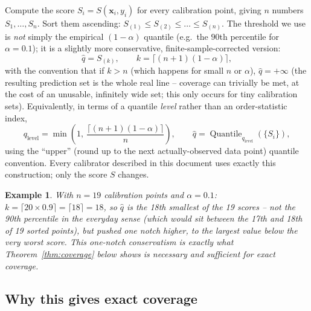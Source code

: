\documentclass[11pt]{article}
\newtheorem{example}{Example}[section]
\begin{document}
Compute the score $S_i = S(\bm x_i, y_i)$ for every calibration point, giving $n$ numbers
$S_1,\dots,S_n$. Sort them ascending: $S_{(1)} \le S_{(2)} \le \dots \le S_{(n)}$. The threshold we
use is \emph{not} simply the empirical $(1-\alpha)$ quantile (e.g.\ the $90$th percentile for
$\alpha=0.1$); it is a slightly more conservative, finite-sample-corrected version:
\begin{equation}
\hat q = S_{(k)}, \qquad k = \Big\lceil (n+1)(1-\alpha) \Big\rceil,
\label{eq:qlevel-order}
\end{equation}
with the convention that if $k>n$ (which happens for small $n$ or $\alpha$), $\hat q = +\infty$
(the resulting prediction set is the whole real line -- coverage can trivially be met, at the cost
of an unusable, infinitely wide set; this only occurs for tiny calibration sets). Equivalently, in
terms of a quantile \emph{level} rather than an order-statistic index,
\begin{equation}
q_{\mathrm{level}} = \min\!\left(1,\ \frac{\lceil (n+1)(1-\alpha)\rceil}{n}\right), \qquad
\hat q = \operatorname{Quantile}_{q_{\mathrm{level}}}(\{S_i\}),
\label{eq:qlevel}
\end{equation}
using the ``upper'' (round up to the next actually-observed data point) quantile convention. Every
calibrator described in this document uses exactly this construction; only the score $S$ changes.

\begin{example}
With $n=19$ calibration points and $\alpha=0.1$: $k = \lceil 20\times0.9\rceil = \lceil 18\rceil =
18$, so $\hat q$ is the \emph{18th smallest} of the 19 scores -- not the 90th percentile in the
everyday sense (which would sit between the 17th and 18th of 19 sorted points), but pushed one
notch higher, to the largest value below the very worst score. This one-notch conservatism is
exactly what Theorem~\ref{thm:coverage} below shows is necessary and sufficient for exact
coverage.
\end{example}

\subsection{Why this gives exact coverage}
\label{sec:validity}
\end{document}
